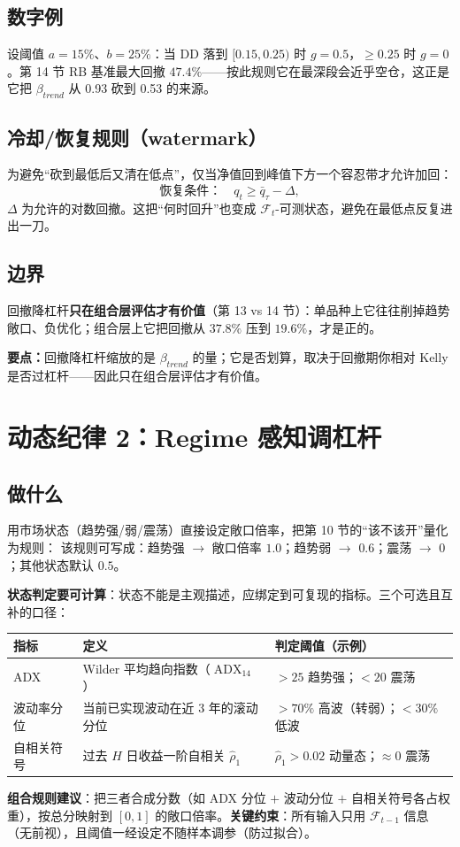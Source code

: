 \documentclass[UTF8,11pt]{ctexart}
\newcommand{\takeaway}[1]{\medskip\par\noindent\textbf{要点：}#1\par\medskip}
\begin{document}
\subsection{数字例}
设阈值 $a=15\%$、$b=25\%$：当 $\mathrm{DD}$ 落到 $[0.15,0.25)$ 时 $g=0.5$，$\ge0.25$ 时 $g=0$。第 14 节 RB 基准最大回撤 $47.4\%$——按此规则它在最深段会近乎空仓，这正是它把 $\beta_{trend}$ 从 0.93 砍到 0.53 的来源。
\subsection{冷却/恢复规则（watermark）}
为避免“砍到最低后又清在低点”，仅当净值回到峰值下方一个容忍带才允许加回：
\begin{equation}
\text{恢复条件：}\quad q_t \ge \bar q_\tau - \Delta,
\end{equation}
$\Delta$ 为允许的对数回撤。这把“何时回升”也变成 $\mathcal{F}_t$-可测状态，避免在最低点反复进出一刀。
\subsection{边界}
回撤降杠杆\textbf{只在组合层评估才有价值}（第 13 vs 14 节）：单品种上它往往削掉趋势敞口、负优化；组合层上它把回撤从 $37.8\%$ 压到 $19.6\%$，才是正的。

\takeaway{回撤降杠杆缩放的是 $\beta_{trend}$ 的量；它是否划算，取决于回撤期你相对 Kelly 是否过杠杆——因此只在组合层评估才有价值。}

\section{动态纪律 2：Regime 感知调杠杆}
\subsection{做什么}
用市场状态（趋势强/弱/震荡）直接设定敞口倍率，把第 10 节的“该不该开”量化为规则：
该规则可写成：趋势强 $\to$ 敞口倍率 $1.0$；趋势弱 $\to$ $0.6$；震荡 $\to$ $0$；其他状态默认 $0.5$。

\textbf{状态判定要可计算}：状态不能是主观描述，应绑定到可复现的指标。三个可选且互补的口径：
\begin{center}
\renewcommand{\arraystretch}{1.4}
\begin{tabular}{@{}l>{\raggedright\arraybackslash}p{3.4cm}>{\raggedright\arraybackslash}p{3.4cm}@{}}
\toprule
指标 & 定义 & 判定阈值（示例） \\
\midrule
ADX & Wilder 平均趋向指数（$\operatorname{ADX}_{14}$） & $>25$ 趋势强；$<20$ 震荡 \\
波动率分位 & 当前已实现波动在近 3 年的滚动分位 & $>70\%$ 高波（转弱）；$<30\%$ 低波 \\
自相关符号 & 过去 $H$ 日收益一阶自相关 $\hat\rho_1$ & $\hat\rho_1>0.02$ 动量态；$\approx0$ 震荡 \\
\bottomrule
\end{tabular}
\end{center}
\textbf{组合规则建议}：把三者合成分数（如 ADX 分位 $+$ 波动分位 $+$ 自相关符号各占权重），按总分映射到 $[0,1]$ 的敞口倍率。\textbf{关键约束}：所有输入只用 $\mathcal{F}_{t-1}$ 信息（无前视），且阈值一经设定不随样本调参（防过拟合）。
\end{document}
